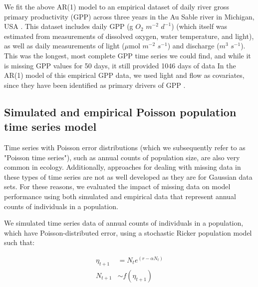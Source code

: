 \documentclass{article}
\begin{document}

We fit the above AR(1) model to an empirical dataset of daily river gross primary productivity (GPP) across three years in the Au Sable river in Michigan, USA  \citep{hall_turbidity_2015}. This dataset includes daily GPP (g \(O_2\) \(m^{-2}\) \(d^{-1}\)) (which itself was estimated from measurements of dissolved oxygen, water temperature, and light), as  well as daily measurements of light (\(\mu\)mol \(m^{-2}\) \(s^{-1}\)) and discharge (\(m^{3}\) \(s^{-1}\)). This was the longest, most complete GPP time series we could find, and while it is missing GPP values for 50 days, it still provided 1046 days of data %
In the AR(1) model of this empirical GPP data, we used light and flow as covariates, since they have been identified as primary drivers of GPP \citep{bernhardt_metabolic_2018}. 

\subsection*{Simulated and empirical Poisson population time series model}

Time series with Poisson error distributions (which we subsequently refer to as "Poisson time series"), such as annual counts of population size, are also very common in ecology. Additionally, approaches for dealing with missing data in these types of time series are not as well developed as they are for Gaussian data sets. For these reasons, we evaluated the impact of missing data on model performance using both simulated and empirical data that represent annual counts of individuals in a population. 


We simulated time series data of annual counts of individuals in a population, which have Poisson-distributed error, using a stochastic Ricker population model \citep{ricker1954stock} such that:


\begin{subequations}
\begin{align} \label{eq:ricker2}
    \eta_{t+1} &= N_t e^{(r - \alpha N_t)}\\
    N_{t+1} &\sim f(\eta_{t+1})
\end{align}
\end{subequations}
\end{document}
